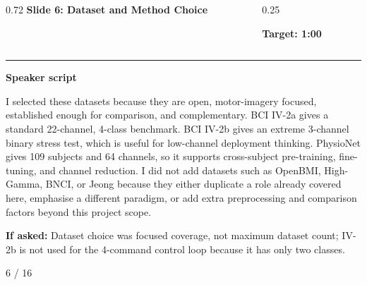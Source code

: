 \documentclass[aspectratio=169,10pt]{beamer}
\begin{document}
\begin{frame}[plain]
\vspace*{0.16cm}
\begin{columns}[T,totalwidth=\textwidth]
\begin{column}{0.72\textwidth}
{\fontsize{17}{18.5}\selectfont\bfseries Slide 6: Dataset and Method Choice}
\end{column}
\begin{column}{0.25\textwidth}
\raggedleft
\colorbox{noteCream}{\parbox{0.88\linewidth}{\centering\bfseries Target: 1:00}}
\end{column}
\end{columns}
\vspace{0.10cm}
{\color{uomPurple}\rule{\textwidth}{1.2pt}}
\vspace{0.18cm}
{\color{uomPurple}\bfseries Speaker script}
\vspace{0.06cm}
\setlength{\fboxsep}{6pt}
\noindent\colorbox{panelGrey}{\begin{minipage}{0.94\textwidth}
\justifying\fontsize{11.0}{13.4}\selectfont
I selected these datasets because they are open, motor-imagery focused, established enough for comparison, and complementary. BCI IV-2a gives a standard 22-channel, 4-class benchmark. BCI IV-2b gives an extreme 3-channel binary stress test, which is useful for low-channel deployment thinking. PhysioNet gives 109 subjects and 64 channels, so it supports cross-subject pre-training, fine-tuning, and channel reduction. I did not add datasets such as OpenBMI, High-Gamma, BNCI, or Jeong because they either duplicate a role already covered here, emphasise a different paradigm, or add extra preprocessing and comparison factors beyond this project scope.
\end{minipage}}
\vspace{0.22cm}
\noindent\colorbox{noteCream}{\begin{minipage}{0.94\textwidth}
\fontsize{9.6}{11.6}\selectfont
{\bfseries If asked:} Dataset choice was focused coverage, not maximum dataset count; IV-2b is not used for the 4-command control loop because it has only two classes.
\end{minipage}}
\vfill
\hfill{\color{textDark}\scriptsize 6 / 16}
\end{frame}
\end{document}
